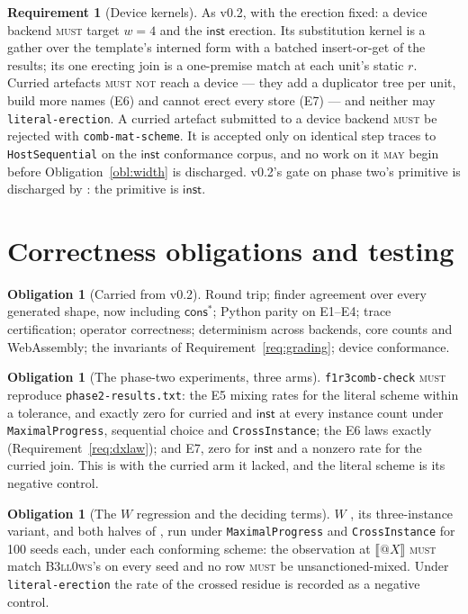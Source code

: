 \documentclass[11pt,a4paper]{article}
\makeatletter
\newcommand{\code}[1]{\texttt{#1}}
\newcommand{\Bell}{\textsc{B3ll0ws}}
\newcommand{\MUST}{\textsc{must}}
\newcommand{\MUSTNOT}{\textsc{must not}}
\newcommand{\MAY}{\textsc{may}}
\newcommand{\quo}[1]{@#1}
\theoremstyle{definition}
\newtheorem{requirement}[definition]{Requirement}
\newtheorem{obligation}[definition]{Obligation}
\theoremstyle{plain}
\newcommand{\inst}{\mathsf{inst}}
\newcommand{\enc}[1]{\llbracket #1 \rrbracket}
\newcommand{\cstar}{\mathsf{cons}^{*}}
\makeatother
\begin{document}
\begin{requirement}[Device kernels]\label{req:device}
As v0.2, with the erection fixed: a device backend \MUST{} target $w = 4$ and
the $\inst$ erection. Its substitution kernel is a gather over the template's
interned form with a batched insert-or-get of the results; its one erecting
join is a one-premise match at each unit's static $r$. Curried artefacts
\MUSTNOT{} reach a device --- they add a duplicator tree per unit, build more
names (E6) and cannot erect every store (E7) --- and neither may
\code{literal-erection}. A curried artefact submitted to a device backend
\MUST{} be rejected with \code{comb-mat-scheme}. It is accepted only on
identical step traces to \code{HostSequential} on the $\inst$ conformance
corpus, and no work on it \MAY{} begin before Obligation~\ref{obl:width} is
discharged. v0.2's gate on phase two's primitive is discharged by
\cite[\S6.7]{draft3}: the primitive is $\inst$.
\end{requirement}

\section{Correctness obligations and testing}\label{sec:test}

\begin{obligation}[Carried from v0.2]\label{obl:carried}
Round trip; finder agreement over every generated shape, now including
$\cstar$; Python parity on E1--E4; trace certification; operator correctness;
determinism across backends, core counts and WebAssembly; the invariants of
Requirement~\ref{req:grading}; device conformance.
\end{obligation}

\begin{obligation}[The phase-two experiments, three arms]\label{obl:phase2}
\code{f1r3comb-check} \MUST{} reproduce \code{phase2-results.txt}: the E5
mixing rates for the literal scheme within a tolerance, and exactly zero for
curried and $\inst$ at every instance count under \code{MaximalProgress},
sequential choice and \code{CrossInstance}; the E6 laws exactly
(Requirement~\ref{req:dxlaw}); and E7, zero for $\inst$ and a nonzero rate
for the curried join. This is \cite[Obl.~11.3]{combspec} with the curried arm
it lacked, and the literal scheme is its negative control.
\end{obligation}

\begin{obligation}[The $W$ regression and the deciding terms]\label{obl:W}
$W$ \cite[Obl.~11.1]{combspec}, its three-instance variant, and both halves of
\cite[Req.~5.18]{combspec}, run under \code{MaximalProgress} and
\code{CrossInstance} for 100 seeds each, under each conforming scheme: the
observation at $\enc{\quo{X}}$ \MUST{} match \Bell's on every seed and no row
\MUST{} be unsanctioned-mixed. Under \code{literal-erection} the rate of the
crossed residue is recorded as a negative control.
\end{obligation}
\end{document}
